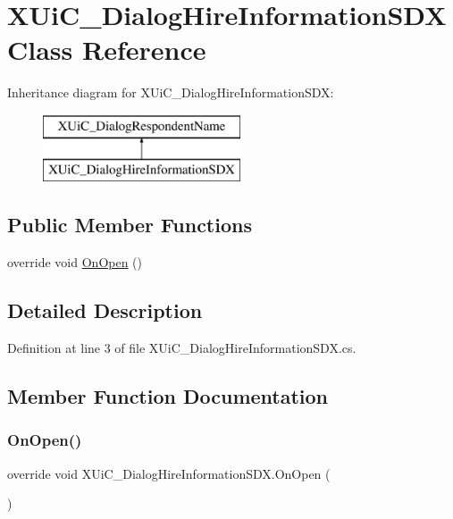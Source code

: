 \hypertarget{class_x_ui_c___dialog_hire_information_s_d_x}{}\section{X\+Ui\+C\+\_\+\+Dialog\+Hire\+Information\+S\+DX Class Reference}
\label{class_x_ui_c___dialog_hire_information_s_d_x}
Inheritance diagram for X\+Ui\+C\+\_\+\+Dialog\+Hire\+Information\+S\+DX\+:\begin{figure}[H]
\begin{center}
\leavevmode
\includegraphics[height=2.000000cm]{class_x_ui_c___dialog_hire_information_s_d_x}
\end{center}
\end{figure}
\subsection*{Public Member Functions}
\begin{DoxyCompactItemize}
\item 
override void \mbox{\hyperlink{class_x_ui_c___dialog_hire_information_s_d_x_a114f430d83194ae17da0e36c620f3d98}{On\+Open}} ()
\end{DoxyCompactItemize}


\subsection{Detailed Description}


Definition at line 3 of file X\+Ui\+C\+\_\+\+Dialog\+Hire\+Information\+S\+D\+X.\+cs.



\subsection{Member Function Documentation}
\mbox{\label{class_x_ui_c___dialog_hire_information_s_d_x_a114f430d83194ae17da0e36c620f3d98}} 
\subsubsection{\texorpdfstring{OnOpen()}{OnOpen()}}
{\footnotesize\ttfamily override void X\+Ui\+C\+\_\+\+Dialog\+Hire\+Information\+S\+D\+X.\+On\+Open (\begin{DoxyParamCaption}{ }\end{DoxyParamCaption})}



